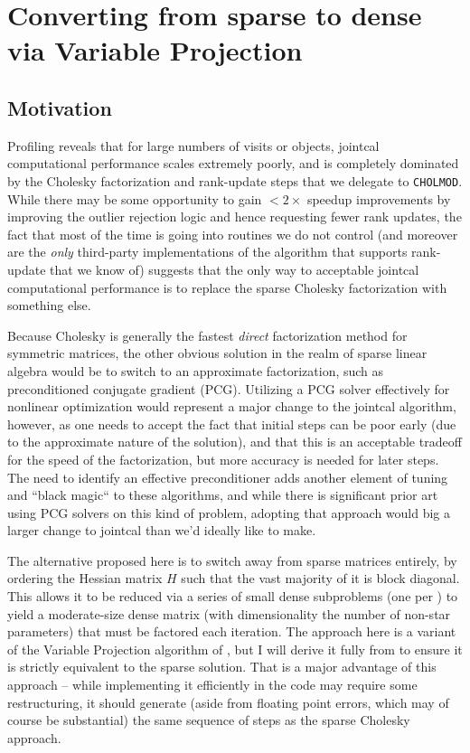 \section{Converting from sparse to dense via Variable Projection}

\subsection{Motivation}

Profiling reveals that for large numbers of visits or objects, jointcal computational performance scales extremely poorly, and is completely dominated by the Cholesky factorization and rank-update steps that we delegate to \texttt{CHOLMOD}.
While there may be some opportunity to gain $<2\times$ speedup improvements by improving the outlier rejection logic and hence requesting fewer rank updates, the fact that most of the time is going into routines we do not control (and moreover are the \emph{only} third-party implementations of the algorithm that supports rank-update that we know of) suggests that the only way to acceptable jointcal computational performance is to replace the sparse Cholesky factorization with something else.

Because Cholesky is generally the fastest \emph{direct} factorization method for symmetric matrices, the other obvious solution in the realm of sparse linear algebra would be to switch to an approximate factorization, such as preconditioned conjugate gradient (PCG).
Utilizing a PCG solver effectively for nonlinear optimization would represent a major change to the jointcal algorithm, however, as one needs to accept the fact that initial steps can be poor early (due to the approximate nature of the solution), and that this is an acceptable tradeoff for the speed of the factorization, but more accuracy is needed for later steps.
The need to identify an effective preconditioner adds another element of tuning and ``black magic`` to these algorithms, and while there is significant prior art using PCG solvers on this kind of problem, adopting that approach would big a larger change to jointcal than we'd ideally like to make.

The alternative proposed here is to switch away from sparse matrices entirely, by ordering the Hessian matrix $H$ such that the vast majority of it is block diagonal.
This allows it to be reduced via a series of small dense subproblems (one per ) to yield a moderate-size dense matrix (with dimensionality the number of non-star parameters) that must be factored each iteration.
The approach here is a variant of the Variable Projection algorithm of \citet{1973SJNA...10..413G}, but I will derive it fully from  to ensure it is strictly equivalent to the sparse solution.
That is a major advantage of this approach -- while implementing it efficiently in the code may require some restructuring, it should generate (aside from floating point errors, which may of course be substantial) the same sequence of steps as the sparse Cholesky approach.

